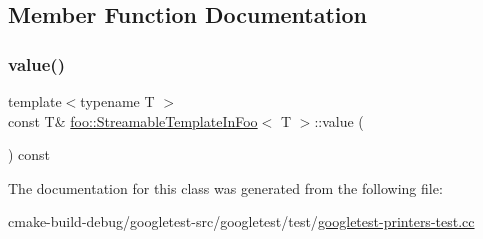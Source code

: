 \subsection{Member Function Documentation}
\mbox{\label{classfoo_1_1StreamableTemplateInFoo_aa6e29a9a298014ce74c65423b6985023}} 
\subsubsection{\texorpdfstring{value()}{value()}}
{\footnotesize\ttfamily template$<$typename T $>$ \\
const T\& \mbox{\hyperlink{classfoo_1_1StreamableTemplateInFoo}{foo\+::\+Streamable\+Template\+In\+Foo}}$<$ T $>$\+::value (\begin{DoxyParamCaption}{ }\end{DoxyParamCaption}) const\hspace{0.3cm}{\ttfamily [inline]}}



The documentation for this class was generated from the following file\+:\begin{DoxyCompactItemize}
\item 
cmake-\/build-\/debug/googletest-\/src/googletest/test/\mbox{\hyperlink{googletest-printers-test_8cc}{googletest-\/printers-\/test.\+cc}}\end{DoxyCompactItemize}
